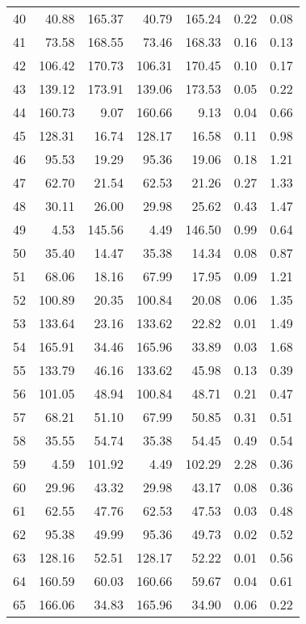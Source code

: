 \begin{tabular}{lrrrrrr}
40 &    40.88 &   165.37 &      40.79 &     165.24 &          0.22 &          0.08 \\
41 &    73.58 &   168.55 &      73.46 &     168.33 &          0.16 &          0.13 \\
42 &   106.42 &   170.73 &     106.31 &     170.45 &          0.10 &          0.17 \\
43 &   139.12 &   173.91 &     139.06 &     173.53 &          0.05 &          0.22 \\
44 &   160.73 &     9.07 &     160.66 &       9.13 &          0.04 &          0.66 \\
45 &   128.31 &    16.74 &     128.17 &      16.58 &          0.11 &          0.98 \\
46 &    95.53 &    19.29 &      95.36 &      19.06 &          0.18 &          1.21 \\
47 &    62.70 &    21.54 &      62.53 &      21.26 &          0.27 &          1.33 \\
48 &    30.11 &    26.00 &      29.98 &      25.62 &          0.43 &          1.47 \\
49 &     4.53 &   145.56 &       4.49 &     146.50 &          0.99 &          0.64 \\
50 &    35.40 &    14.47 &      35.38 &      14.34 &          0.08 &          0.87 \\
51 &    68.06 &    18.16 &      67.99 &      17.95 &          0.09 &          1.21 \\
52 &   100.89 &    20.35 &     100.84 &      20.08 &          0.06 &          1.35 \\
53 &   133.64 &    23.16 &     133.62 &      22.82 &          0.01 &          1.49 \\
54 &   165.91 &    34.46 &     165.96 &      33.89 &          0.03 &          1.68 \\
55 &   133.79 &    46.16 &     133.62 &      45.98 &          0.13 &          0.39 \\
56 &   101.05 &    48.94 &     100.84 &      48.71 &          0.21 &          0.47 \\
57 &    68.21 &    51.10 &      67.99 &      50.85 &          0.31 &          0.51 \\
58 &    35.55 &    54.74 &      35.38 &      54.45 &          0.49 &          0.54 \\
59 &     4.59 &   101.92 &       4.49 &     102.29 &          2.28 &          0.36 \\
60 &    29.96 &    43.32 &      29.98 &      43.17 &          0.08 &          0.36 \\
61 &    62.55 &    47.76 &      62.53 &      47.53 &          0.03 &          0.48 \\
62 &    95.38 &    49.99 &      95.36 &      49.73 &          0.02 &          0.52 \\
63 &   128.16 &    52.51 &     128.17 &      52.22 &          0.01 &          0.56 \\
64 &   160.59 &    60.03 &     160.66 &      59.67 &          0.04 &          0.61 \\
65 &   166.06 &    34.83 &     165.96 &      34.90 &          0.06 &          0.22 \\
\bottomrule
\end{tabular}
